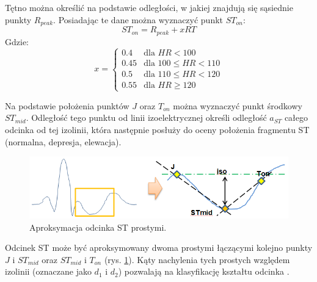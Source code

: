 Tętno można określić na podstawie odległości, w jakiej znajdują się sąsiednie punkty $ R_{peak} $. Posiadając te dane można wyznaczyć punkt $ ST_{on} $:
\begin{equation}
	ST_{on} = R_{peak} + xRT
\end{equation}
Gdzie:
\begin{equation}
	x = 
	\begin{cases}
	0.4		& \text{dla } HR < 100 \\
	0.45	& \text{dla } 100 \leq HR < 110 \\
	0.5		& \text{dla } 110 \leq HR < 120 \\
	0.55	& \text{dla } HR \geq 120
	\end{cases}
\end{equation}

Na podstawie położenia punktów $ J $ oraz $ T_{on} $ można wyznaczyć punkt środkowy $ ST_{mid} $. Odległość tego punktu od linii izoelektrycznej określi odległość $ a_{ST} $ całego odcinka od tej izolinii, która następnie posłuży do oceny położenia fragmentu ST (normalna, depresja, elewacja).
\begin{figure}[H]
	\centering
	\includegraphics[width=1\textwidth]{ST_INTERVAL/img/ST_aproksymacjaST.png}
	\caption{Aproksymacja odcinka ST prostymi.}
	\label{fig:ST_aproksymacjaST}
\end{figure}
Odcinek ST może być aproksymowany dwoma prostymi łączącymi kolejno punkty $ J $ i $ ST_{mid} $ oraz $ ST_{mid} $ i $ T_{on} $ (rys. \ref{fig:ST_aproksymacjaST}). Kąty nachylenia tych prostych względem izolinii (oznaczane jako $ d_1 $ i $ d_2 $) pozwalają na klasyfikację kształtu odcinka \cite{STInt2}.

